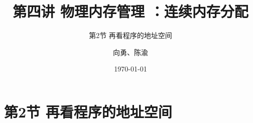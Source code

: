 


\title[第4讲]{第四讲 物理内存管理 ：连续内存分配} %
\subtitle{第2节 再看程序的地址空间}
\author{向勇、陈渝} %
\date{\today} %



\begin{frame}
\titlepage %
\end{frame}


\section{第2节 再看程序的地址空间}%
